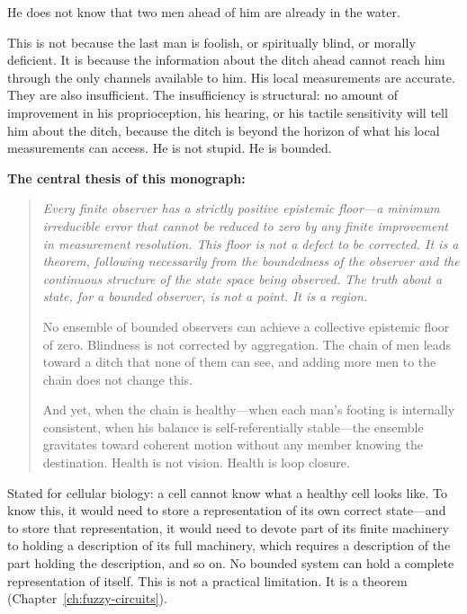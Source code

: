 He does not know that two men ahead of him are already in the water.

This is not because the last man is foolish, or spiritually blind, or
morally deficient.  It is because the information about the ditch ahead
cannot reach him through the only channels available to him.  His local
measurements are accurate.  They are also insufficient.  The insufficiency
is structural: no amount of improvement in his proprioception, his hearing,
or his tactile sensitivity will tell him about the ditch, because the ditch
is beyond the horizon of what his local measurements can access.  He is not
stupid.  He is bounded.

\medskip

\noindent\textbf{The central thesis of this monograph:}

\medskip
\begin{quote}
\itshape
Every finite observer has a strictly positive epistemic floor---a minimum
irreducible error that cannot be reduced to zero by any finite improvement
in measurement resolution.  This floor is not a defect to be corrected.
It is a theorem, following necessarily from the boundedness of the observer
and the continuous structure of the state space being observed.  The truth
about a state, for a bounded observer, is not a point.  It is a region.

No ensemble of bounded observers can achieve a collective epistemic floor
of zero.  Blindness is not corrected by aggregation.  The chain of men
leads toward a ditch that none of them can see, and adding more men to the
chain does not change this.

And yet, when the chain is healthy---when each man's footing is internally
consistent, when his balance is self-referentially stable---the ensemble
gravitates toward coherent motion without any member knowing the
destination.  Health is not vision.  Health is loop closure.
\end{quote}

\medskip

Stated for cellular biology: a cell cannot know what a healthy cell looks
like.  To know this, it would need to store a representation of its own
correct state---and to store that representation, it would need to devote
part of its finite machinery to holding a description of its full machinery,
which requires a description of the part holding the description, and so
on.  No bounded system can hold a complete representation of itself.  This
is not a practical limitation.  It is a theorem (Chapter~\ref{ch:fuzzy-circuits}).

